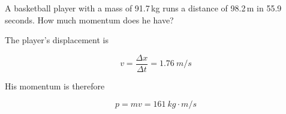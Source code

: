 \documentclass[../main-physics-problems.tex]{subfiles}
\begin{document}
\begin{questions}



\question %
A basketball player with a mass of 91.7\,kg runs a distance of 98.2\,m in 55.9 seconds.  How much momentum does he have?

\begin{solution}
The player's displacement is

\begin{equation*}
    v = \frac{\Delta x}{\Delta t} = {\SI{1.76}{m/s}}
\end{equation*}

His momentum is therefore

\begin{equation*}
    p = mv = \boxed{\SI{161}{kg\cdot m/s}}
\end{equation*}
\end{solution}












\end{questions}
\end{document}
